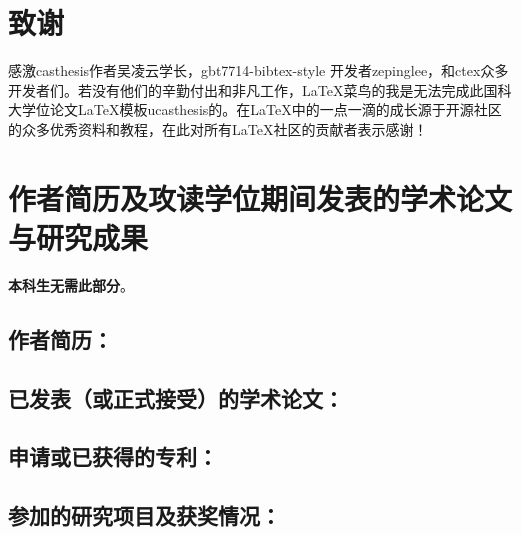 \chapter[致谢]{致\quad 谢}%

感激casthesis作者吴凌云学长，gbt7714-bibtex-style
开发者zepinglee，和ctex众多开发者们。若没有他们的辛勤付出和非凡工作，\LaTeX{}菜鸟的我是无法完成此国科大学位论文\LaTeX{}模板ucasthesis的。在\LaTeX{}中的一点一滴的成长源于开源社区的众多优秀资料和教程，在此对所有\LaTeX{}社区的贡献者表示感谢！


\chapter{作者简历及攻读学位期间发表的学术论文与研究成果}

\textbf{本科生无需此部分}。

\section*{作者简历：}

\section*{已发表（或正式接受）的学术论文：}

\section*{申请或已获得的专利：}

\section*{参加的研究项目及获奖情况：}

\cleardoublepage[plain]%
